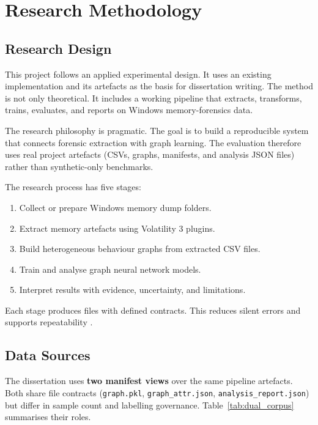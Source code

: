 \chapter{Research Methodology}
\label{ch:methodology}

\section{Research Design}

This project follows an applied experimental design. It uses an existing implementation and its artefacts as the basis for dissertation writing. The method is not only theoretical. It includes a working pipeline that extracts, transforms, trains, evaluates, and reports on Windows memory-forensics data.

The research philosophy is pragmatic. The goal is to build a reproducible system that connects forensic extraction with graph learning. The evaluation therefore uses real project artefacts (CSVs, graphs, manifests, and analysis JSON files) rather than synthetic-only benchmarks.

The research process has five stages:

\begin{enumerate}
\item Collect or prepare Windows memory dump folders.
\item Extract memory artefacts using Volatility 3 plugins.
\item Build heterogeneous behaviour graphs from extracted CSV files.
\item Train and analyse graph neural network models.
\item Interpret results with evidence, uncertainty, and limitations.
\end{enumerate}

Each stage produces files with defined contracts. This reduces silent errors and supports repeatability \cite{goodman2016reproducibility}.

\section{Data Sources}

The dissertation uses \textbf{two manifest views} over the same pipeline artefacts. Both share file contracts (\texttt{graph.pkl}, \texttt{graph\_attr.json}, \texttt{analysis\_report.json}) but differ in sample count and labelling governance. Table~\ref{tab:dual_corpus} summarises their roles.

